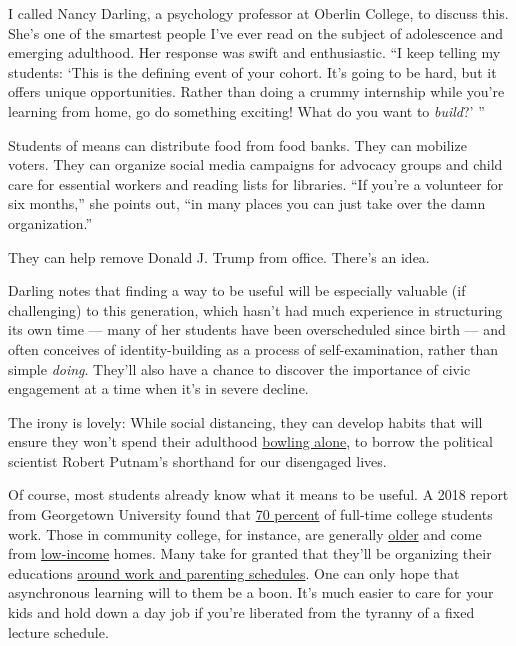 I called Nancy Darling, a psychology professor at Oberlin College, to
discuss this. She's one of the smartest people I've ever read on the
subject of adolescence and emerging adulthood. Her response was swift
and enthusiastic. ``I keep telling my students: `This is the defining
event of your cohort. It's going to be hard, but it offers unique
opportunities. Rather than doing a crummy internship while you're
learning from home, go do something exciting! What do you want to
\emph{build}?' ''

Students of means can distribute food from food banks. They can mobilize
voters. They can organize social media campaigns for advocacy groups and
child care for essential workers and reading lists for libraries. ``If
you're a volunteer for six months,'' she points out, ``in many places
you can just take over the damn organization.''

They can help remove Donald J. Trump from office. There's an idea.

Darling notes that finding a way to be useful will be especially
valuable (if challenging) to this generation, which hasn't had much
experience in structuring its own time --- many of her students have
been overscheduled since birth --- and often conceives of
identity-building as a process of self-examination, rather than simple
\emph{doing}. They'll also have a chance to discover the importance of
civic engagement at a time when it's in severe decline.

The irony is lovely: While social distancing, they can develop habits
that will ensure they won't spend their adulthood
\href{http://-fabric-political-scientist-renews-his-alarm.html/}{bowling
alone}, to borrow the political scientist Robert Putnam's shorthand for
our disengaged lives.

Of course, most students already know what it means to be useful. A 2018
report from Georgetown University found that
\href{https://www.insidehighered.com/news/2019/11/18/most-college-students-work-and-thats-both-good-and-bad\#:~:text=The\%20Georgetown\%20report\%20found\%20that,time\%20college\%20students\%20are\%20working.}{70
percent} of full-time college students work. Those in community college,
for instance, are generally
\href{https://www.usnews.com/education/community-colleges/articles/2015/02/06/frequently-asked-questions-community-college}{older}
and come from
\href{https://ccrc.tc.columbia.edu/Community-College-FAQs.html}{low-income}
homes. Many take for granted that they'll be organizing their educations
\href{https://iwpr.org/publications/parents-college-numbers/\#:~:text=Today's\%20Student\%20Parent\%20Population,National\%20Postsecondary\%20Student\%20Aid\%20Study.}{around
work and parenting schedules}. One can only hope that asynchronous
learning will to them be a boon. It's much easier to care for your kids
and hold down a day job if you're liberated from the tyranny of a fixed
lecture schedule.

